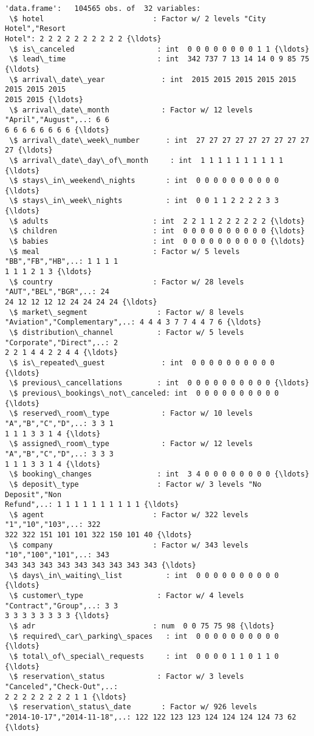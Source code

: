 \documentclass[11pt]{article}
\begin{document}
    
    \begin{Verbatim}[commandchars=\\\{\}]
'data.frame':   104565 obs. of  32 variables:
 \$ hotel                         : Factor w/ 2 levels "City Hotel","Resort
Hotel": 2 2 2 2 2 2 2 2 2 2 {\ldots}
 \$ is\_canceled                   : int  0 0 0 0 0 0 0 0 1 1 {\ldots}
 \$ lead\_time                     : int  342 737 7 13 14 14 0 9 85 75 {\ldots}
 \$ arrival\_date\_year             : int  2015 2015 2015 2015 2015 2015 2015 2015
2015 2015 {\ldots}
 \$ arrival\_date\_month            : Factor w/ 12 levels "April","August",..: 6 6
6 6 6 6 6 6 6 6 {\ldots}
 \$ arrival\_date\_week\_number      : int  27 27 27 27 27 27 27 27 27 27 {\ldots}
 \$ arrival\_date\_day\_of\_month     : int  1 1 1 1 1 1 1 1 1 1 {\ldots}
 \$ stays\_in\_weekend\_nights       : int  0 0 0 0 0 0 0 0 0 0 {\ldots}
 \$ stays\_in\_week\_nights          : int  0 0 1 1 2 2 2 2 3 3 {\ldots}
 \$ adults                        : int  2 2 1 1 2 2 2 2 2 2 {\ldots}
 \$ children                      : int  0 0 0 0 0 0 0 0 0 0 {\ldots}
 \$ babies                        : int  0 0 0 0 0 0 0 0 0 0 {\ldots}
 \$ meal                          : Factor w/ 5 levels "BB","FB","HB",..: 1 1 1 1
1 1 1 2 1 3 {\ldots}
 \$ country                       : Factor w/ 28 levels "AUT","BEL","BGR",..: 24
24 12 12 12 12 24 24 24 24 {\ldots}
 \$ market\_segment                : Factor w/ 8 levels
"Aviation","Complementary",..: 4 4 4 3 7 7 4 4 7 6 {\ldots}
 \$ distribution\_channel          : Factor w/ 5 levels "Corporate","Direct",..: 2
2 2 1 4 4 2 2 4 4 {\ldots}
 \$ is\_repeated\_guest             : int  0 0 0 0 0 0 0 0 0 0 {\ldots}
 \$ previous\_cancellations        : int  0 0 0 0 0 0 0 0 0 0 {\ldots}
 \$ previous\_bookings\_not\_canceled: int  0 0 0 0 0 0 0 0 0 0 {\ldots}
 \$ reserved\_room\_type            : Factor w/ 10 levels "A","B","C","D",..: 3 3 1
1 1 1 3 3 1 4 {\ldots}
 \$ assigned\_room\_type            : Factor w/ 12 levels "A","B","C","D",..: 3 3 3
1 1 1 3 3 1 4 {\ldots}
 \$ booking\_changes               : int  3 4 0 0 0 0 0 0 0 0 {\ldots}
 \$ deposit\_type                  : Factor w/ 3 levels "No Deposit","Non
Refund",..: 1 1 1 1 1 1 1 1 1 1 {\ldots}
 \$ agent                         : Factor w/ 322 levels "1","10","103",..: 322
322 322 151 101 101 322 150 101 40 {\ldots}
 \$ company                       : Factor w/ 343 levels "10","100","101",..: 343
343 343 343 343 343 343 343 343 343 {\ldots}
 \$ days\_in\_waiting\_list          : int  0 0 0 0 0 0 0 0 0 0 {\ldots}
 \$ customer\_type                 : Factor w/ 4 levels "Contract","Group",..: 3 3
3 3 3 3 3 3 3 3 {\ldots}
 \$ adr                           : num  0 0 75 75 98 {\ldots}
 \$ required\_car\_parking\_spaces   : int  0 0 0 0 0 0 0 0 0 0 {\ldots}
 \$ total\_of\_special\_requests     : int  0 0 0 0 1 1 0 1 1 0 {\ldots}
 \$ reservation\_status            : Factor w/ 3 levels "Canceled","Check-Out",..:
2 2 2 2 2 2 2 2 1 1 {\ldots}
 \$ reservation\_status\_date       : Factor w/ 926 levels
"2014-10-17","2014-11-18",..: 122 122 123 123 124 124 124 124 73 62 {\ldots}
    \end{Verbatim}
\end{document}
